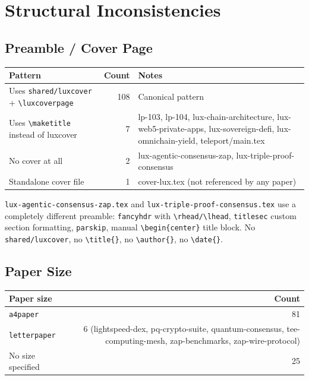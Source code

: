 \documentclass[11pt,a4paper]{article}
\begin{document}
\section{Structural Inconsistencies}\label{sec:structure}

\subsection{Preamble / Cover Page}

\begin{tabular}{lrp{6cm}}
\toprule
\textbf{Pattern} & \textbf{Count} & \textbf{Notes} \\
\midrule
Uses \texttt{shared/luxcover} + \texttt{\textbackslash luxcoverpage} & 108 & Canonical pattern \\
Uses \texttt{\textbackslash maketitle} instead of luxcover & 7 & lp-103, lp-104, lux-chain-architecture, lux-web5-private-apps, lux-sovereign-defi, lux-omnichain-yield, teleport/main.tex \\
No cover at all & 2 & lux-agentic-consensus-zap, lux-triple-proof-consensus \\
Standalone cover file & 1 & cover-lux.tex (not referenced by any paper) \\
\bottomrule
\end{tabular}

\texttt{lux-agentic-consensus-zap.tex} and \texttt{lux-triple-proof-consensus.tex}
use a completely different preamble: \texttt{fancyhdr} with \texttt{\textbackslash rhead/\textbackslash lhead},
\texttt{titlesec} custom section formatting, \texttt{parskip}, manual
\texttt{\textbackslash begin\{center\}} title block. No \texttt{shared/luxcover},
no \texttt{\textbackslash title\{\}}, no \texttt{\textbackslash author\{\}}, no
\texttt{\textbackslash date\{\}}.

\subsection{Paper Size}

\begin{tabular}{lr}
\toprule
\textbf{Paper size} & \textbf{Count} \\
\midrule
\texttt{a4paper} & 81 \\
\texttt{letterpaper} & 6 (lightspeed-dex, pq-crypto-suite, quantum-consensus, tee-computing-mesh, zap-benchmarks, zap-wire-protocol) \\
No size specified & 25 \\
\bottomrule
\end{tabular}
\end{document}
